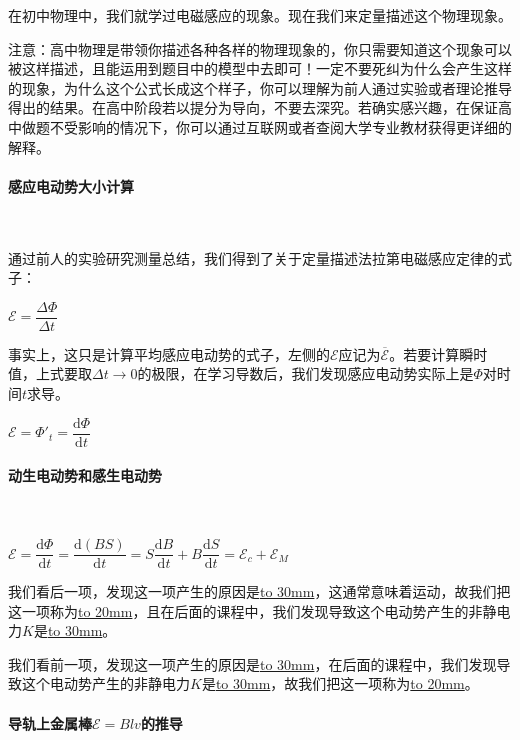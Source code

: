\documentclass{ctexbook}
\begin{document}
	在初中物理中，我们就学过电磁感应的现象。现在我们来定量描述这个物理现象。
	
	注意：高中物理是带领你描述各种各样的物理现象的，你只需要知道这个现象可以被这样描述，且能运用到题目中的模型中去即可！一定不要死纠为什么会产生这样的现象，为什么这个公式长成这个样子，你可以理解为前人通过实验或者理论推导得出的结果。在高中阶段若以提分为导向，不要去深究。若确实感兴趣，在保证高中做题不受影响的情况下，你可以通过互联网或者查阅大学专业教材获得更详细的解释。
	
	\paragraph{感应电动势大小计算}~{}
	\\
	\indent
	
	通过前人的实验研究测量总结，我们得到了关于定量描述法拉第电磁感应定律的式子：
	
	\centerline{$\mathcal{E}=\dfrac{\Delta \varPhi}{\Delta t}$}
	
	事实上，这只是计算平均感应电动势的式子，左侧的$\mathcal{E}$应记为$\overline{\mathcal{E}}$。若要计算瞬时值，上式要取$\Delta t\rightarrow 0$的极限，在学习导数后，我们发现感应电动势实际上是$\varPhi$对时间$t$求导。
	
	\centerline{$\mathcal{E}=\varPhi'_t=\dfrac{\mathrm{d}\varPhi}{\mathrm{d}t}$}
	
	\paragraph{动生电动势和感生电动势}~{}
	\\
	\indent
	
	$\mathcal{E}=\dfrac{\mathrm{d}\varPhi}{\mathrm{d}t}=\dfrac{\mathrm{d} (BS)}{\mathrm{d}t}=S\dfrac{\mathrm{d}B}{\mathrm{d}t}+B\dfrac{\mathrm{d}S}{\mathrm{d}t}=\mathcal{E}_	c+\mathcal{E}_M$
	
	我们看后一项，发现这一项产生的原因是\underline{\hbox to 30mm{}}，这通常意味着运动，故我们把这一项称为\underline{\hbox to 20mm{}}，且在后面的课程中，我们发现导致这个电动势产生的非静电力$K$是\underline{\hbox to 30mm{}}。
	
	我们看前一项，发现这一项产生的原因是\underline{\hbox to 30mm{}}，在后面的课程中，我们发现导致这个电动势产生的非静电力$K$是\underline{\hbox to 30mm{}}，故我们把这一项称为\underline{\hbox to 20mm{}}。
	
	\paragraph{导轨上金属棒$\mathcal{E}=Blv$的推导}~{}
	\\
	\indent
	
\end{document}

